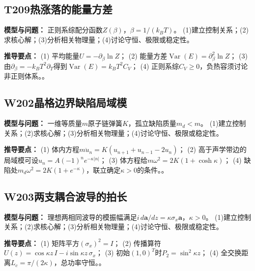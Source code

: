 \par\medskip

\subsection*{T209\quad 热涨落的能量方差}

\textbf{模型与问题：} 正则系综配分函数$Z(\beta)$，$\beta=1/(k_BT)$。 (1)建立控制关系；(2)求核心解；(3)分析相关物理量；(4)讨论守恒、极限或稳定性。

\par\textbf{推导要点：} (1) 平均能量$U=-\partial_\beta\ln Z$； (2) 能量方差$\operatorname{Var}(E)=\partial_\beta^2\ln Z$； (3) 由$\partial_\beta=-k_BT^2\partial_T$得到$\operatorname{Var}(E)=k_BT^2C_V$； (4) 正则系综$C_V\ge0$，负热容须讨论非正则体系。。

\par\medskip

\subsection*{W202\quad 晶格边界缺陷局域模}

\textbf{模型与问题：} 一维等质量$m$原子链弹簧$K$，孤立缺陷质量$m_d<m$。 (1)建立控制关系；(2)求核心解；(3)分析相关物理量；(4)讨论守恒、极限或稳定性。

\par\textbf{推导要点：} (1) 体内方程$m\ddot u_n=K(u_{n+1}+u_{n-1}-2u_n)$； (2) 高于声学带边的局域模可设$u_n=A(-1)^ne^{-\kappa|n|}$； (3) 体方程给$m\omega^2=2K(1+\cosh\kappa)$； (4) 缺陷处$m_d\omega^2=2K(1+e^{-\kappa})$，联立确定$\kappa>0$的条件。。

\par\medskip

\subsection*{W203\quad 两支耦合波导的拍长}

\textbf{模型与问题：} 理想两相同波导的模振幅满足$i\,d\mathbf a/dz=\kappa\sigma_x\mathbf a$，$\kappa>0$。 (1)建立控制关系；(2)求核心解；(3)分析相关物理量；(4)讨论守恒、极限或稳定性。

\par\textbf{推导要点：} (1) 矩阵平方$(\sigma_x)^2=I$； (2) 传播算符$U(z)=\cos\kappa z\,I-i\sin\kappa z\,\sigma_x$； (3) 初始$(1,0)^T$时$P_2=\sin^2\kappa z$； (4) 全交换距离$L_c=\pi/(2\kappa)$，总功率守恒。。

\par\medskip


